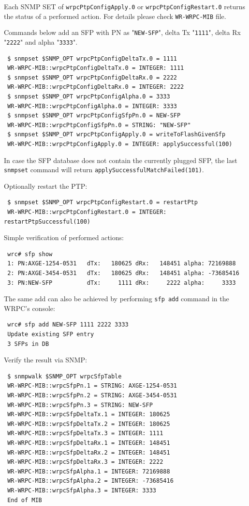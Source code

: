 \documentclass[a4paper, 12pt]{article}
\newcommand{\codeHook}[1]{\mbox{\ttfamily\MakeTextUppercase{#1}}}
\begin{document}
Each SNMP SET of \texttt{wrpcPtpConfigApply.0} or \texttt{wrpcPtpConfigRestart.0} returns
the status of a performed action. For details please check \texttt{WR-WRPC-MIB}
file.

Commands below add an SFP with PN as "\texttt{NEW-SFP}", delta Tx "\texttt{1111}",
delta Rx "\texttt{2222}" and alpha "\texttt{3333}".
\begin{lstlisting}
 $ snmpset $SNMP_OPT wrpcPtpConfigDeltaTx.0 = 1111
 WR-WRPC-MIB::wrpcPtpConfigDeltaTx.0 = INTEGER: 1111
 $ snmpset $SNMP_OPT wrpcPtpConfigDeltaRx.0 = 2222
 WR-WRPC-MIB::wrpcPtpConfigDeltaRx.0 = INTEGER: 2222
 $ snmpset $SNMP_OPT wrpcPtpConfigAlpha.0 = 3333
 WR-WRPC-MIB::wrpcPtpConfigAlpha.0 = INTEGER: 3333
 $ snmpset $SNMP_OPT wrpcPtpConfigSfpPn.0 = NEW-SFP
 WR-WRPC-MIB::wrpcPtpConfigSfpPn.0 = STRING: "NEW-SFP"
 $ snmpset $SNMP_OPT wrpcPtpConfigApply.0 = writeToFlashGivenSfp
 WR-WRPC-MIB::wrpcPtpConfigApply.0 = INTEGER: applySuccessful(100)
\end{lstlisting}

In case the SFP database does not contain the currently plugged SFP, the last
\texttt{snmpset} command will return \texttt{applySuccessfulMatchFailed(101)}.

Optionally restart the PTP:
\begin{lstlisting}
 $ snmpset $SNMP_OPT wrpcPtpConfigRestart.0 = restartPtp
 WR-WRPC-MIB::wrpcPtpConfigRestart.0 = INTEGER: restartPtpSuccessful(100)
\end{lstlisting}

Simple verification of performed actions:
\begin{lstlisting}
 wrc# sfp show
 1: PN:AXGE-1254-0531   dTx:   180625 dRx:   148451 alpha: 72169888
 2: PN:AXGE-3454-0531   dTx:   180625 dRx:   148451 alpha: -73685416
 3: PN:NEW-SFP          dTx:     1111 dRx:     2222 alpha:     3333
\end{lstlisting}

The same add can also be achieved by performing \texttt{sfp add} command in
the \codeHook{wrpc}'s console:
\begin{lstlisting}
 wrc# sfp add NEW-SFP 1111 2222 3333
 Update existing SFP entry
 3 SFPs in DB
\end{lstlisting}

Verify the result via SNMP:
\begin{lstlisting}
 $ snmpwalk $SNMP_OPT wrpcSfpTable
 WR-WRPC-MIB::wrpcSfpPn.1 = STRING: AXGE-1254-0531
 WR-WRPC-MIB::wrpcSfpPn.2 = STRING: AXGE-3454-0531
 WR-WRPC-MIB::wrpcSfpPn.3 = STRING: NEW-SFP
 WR-WRPC-MIB::wrpcSfpDeltaTx.1 = INTEGER: 180625
 WR-WRPC-MIB::wrpcSfpDeltaTx.2 = INTEGER: 180625
 WR-WRPC-MIB::wrpcSfpDeltaTx.3 = INTEGER: 1111
 WR-WRPC-MIB::wrpcSfpDeltaRx.1 = INTEGER: 148451
 WR-WRPC-MIB::wrpcSfpDeltaRx.2 = INTEGER: 148451
 WR-WRPC-MIB::wrpcSfpDeltaRx.3 = INTEGER: 2222
 WR-WRPC-MIB::wrpcSfpAlpha.1 = INTEGER: 72169888
 WR-WRPC-MIB::wrpcSfpAlpha.2 = INTEGER: -73685416
 WR-WRPC-MIB::wrpcSfpAlpha.3 = INTEGER: 3333
 End of MIB
\end{lstlisting}
\end{document}
